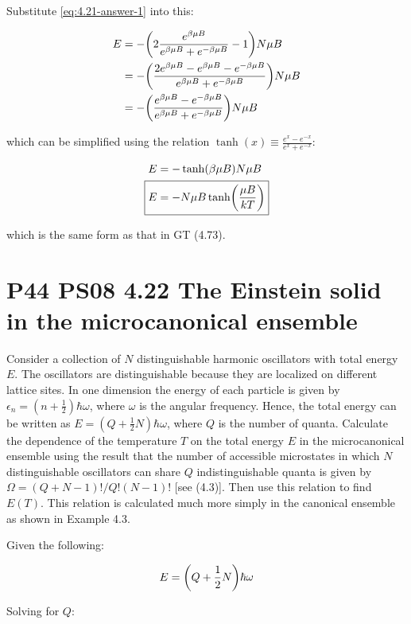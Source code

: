 \documentclass[9pt,a4paper,twocolumn]{article}
\begin{document}
Substitute \eqref{eq:4.21-answer-1} into this:

\begin{align}
	E &= -\qty(2\frac{e^{\beta\mu B}}{e^{\beta\mu B} + e^{-\beta\mu B}} - 1)N\mu B \\
	&= -\qty(\frac{2e^{\beta\mu B} - e^{\beta\mu B} - e^{-\beta\mu B} }{e^{\beta\mu B} + e^{-\beta\mu B}})N\mu B \\
	&= -\qty(\frac{e^{\beta\mu B} - e^{-\beta\mu B} }{e^{\beta\mu B} + e^{-\beta\mu B}})N\mu B
\end{align}

which can be simplified using the relation $\tanh(x) \equiv \frac{e^{x} - e^{-x} }{e^{x} + e^{-x}}$:

\begin{align}
	E &= -\tanh(\beta\mu B)N\mu B \\
	\Aboxed{
		E &= -N\mu B\tanh(\frac{\mu B}{kT})
	} \label{eq:4.21-answer-3}
\end{align}

which is the same form as that in GT (4.73).

\section{P44 PS08 4.22 The Einstein solid in the microcanonical ensemble}
Consider a collection of $N$ distinguishable harmonic oscillators with total energy $E$. The oscillators are distinguishable because they are localized on different lattice sites. In one dimension the energy of each particle is given by $\epsilon_n = (n + \frac{1}{2})\hbar\omega$, where $\omega$ is the angular frequency. Hence, the total energy can be written as $E = (Q + \frac{1}{2}N)\hbar\omega$, where $Q$ is the number of quanta. Calculate the dependence of the temperature $T$ on the total energy $E$ in the microcanonical ensemble using the result that the number of accessible microstates in which $N$ distinguishable oscillators can share $Q$ indistinguishable quanta is given by $\Omega = (Q + N - 1)!/Q!(N - 1)!$ [see (4.3)]. Then use this relation to find $E(T)$. This relation is calculated much more simply in the canonical ensemble as shown in Example 4.3.

Given the following:

\begin{equation}
	E = \qty(Q + \frac{1}{2}N)\hbar\omega \label{eq:given-e}
\end{equation}

Solving for $Q$:
\end{document}
